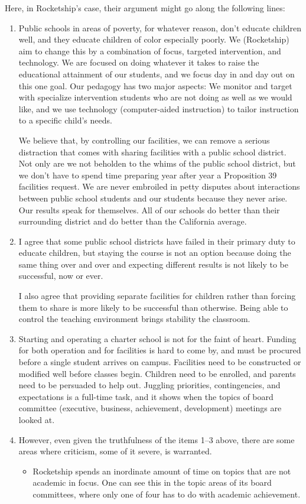 Here, in Rocketship's case, their argument might go along the following lines:
\begin{enumerate}[topsep=0.3\baselineskip,itemsep=0.25\baselineskip]
  \item Public schools in areas of poverty, for whatever reason, don't educate children well, and they educate children of color especially poorly. We (Rocketship) aim to change this by a combination of focus, targeted intervention, and technology. We are focused on doing whatever it takes to raise the educational attainment of our students, and we focus day in and day out on this one goal. Our pedagogy has two major aspects: We monitor and target with specialize intervention students who are not doing as well as we would like, and we use technology (computer-aided instruction) to tailor instruction to a specific child's needs.

  We believe that, by controlling our facilities, we can remove a serious distraction that comes with sharing facilities with a public school district. Not only are we not beholden to the whims of the public school district, but we don't have to spend time preparing year after year a Proposition 39 facilities request. We are never embroiled in petty disputes about interactions between public school students and our students because they never arise. Our results speak for themselves. All of our schools do better than their surrounding district and do better than the California average.
  \item I agree that some public school districts have failed in their primary duty to educate children, but staying the course is not an option because doing the same thing over and over and expecting different results is not likely to be successful, now or ever.
 
  I also agree that providing separate facilities for children rather than forcing them to share is more likely to be successful than otherwise. Being able to control the teaching environment brings stability the classroom.
  \item Starting and operating a charter school is not for the faint of heart. Funding for both operation and for facilities is hard to come by, and must be procured before a single student arrives on campus. Facilities need to be constructed or modified well before classes begin. Children need to be enrolled, and parents need to be persuaded to help out. Juggling priorities, contingencies, and expectations is a full-time task, and it shows when the topics of board committee (executive, business, achievement, development) meetings are looked at.
    \item However, even given the truthfulness of the items 1–3 above, there are some areas where criticism, some of it severe, is warranted.
    \begin{itemize}[topsep=0.3\baselineskip,itemsep=0.25\baselineskip]
      \item Rocketship spends an inordinate amount of time on topics that are not academic in focus. One can see this in the topic areas of its board committees, where only one of four has to do with academic achievement.


\end{itemize}
\end{enumerate}
